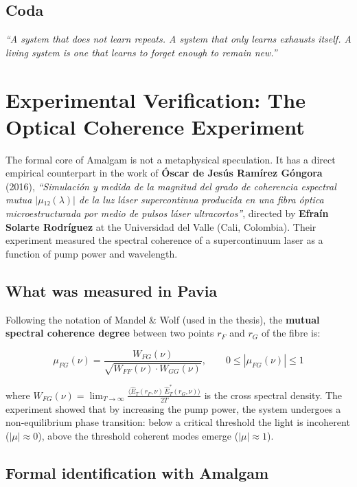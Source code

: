 \documentclass[12pt,oneside]{report}
\begin{document}
\section{Coda}
\emph{“A system that does not learn repeats. A system that only learns exhausts itself. A living system is one that learns to forget enough to remain new.”}

\chapter{Experimental Verification: The Optical Coherence Experiment}

The formal core of Amalgam is not a metaphysical speculation. It has a direct empirical counterpart in the work of \textbf{Óscar de Jesús Ramírez Góngora} (2016), \textit{“Simulación y medida de la magnitud del grado de coherencia espectral mutua \(|μ₁₂(λ)|\) de la luz láser supercontinua producida en una fibra óptica microestructurada por medio de pulsos láser ultracortos”}, directed by \textbf{Efraín Solarte Rodríguez} at the Universidad del Valle (Cali, Colombia). Their experiment measured the spectral coherence of a supercontinuum laser as a function of pump power and wavelength.

\section{What was measured in Pavia}

Following the notation of Mandel \& Wolf (used in the thesis), the \textbf{mutual spectral coherence degree} between two points \(r_F\) and \(r_G\) of the fibre is:

\[
\mu_{FG}(\nu) = \frac{W_{FG}(\nu)}{\sqrt{W_{FF}(\nu)\cdot W_{GG}(\nu)}}, \qquad 0 \le |\mu_{FG}(\nu)| \le 1
\]

where \(W_{FG}(\nu) = \lim_{T\to\infty} \frac{\langle \hat{E}_T(r_F,\nu)\,\hat{E}_T^*(r_G,\nu) \rangle}{2T}\) is the cross spectral density. The experiment showed that by increasing the pump power, the system undergoes a non‑equilibrium phase transition: below a critical threshold the light is incoherent (\(|\mu|\approx 0\)), above the threshold coherent modes emerge (\(|\mu|\approx 1\)).

\section{Formal identification with Amalgam}
\end{document}
